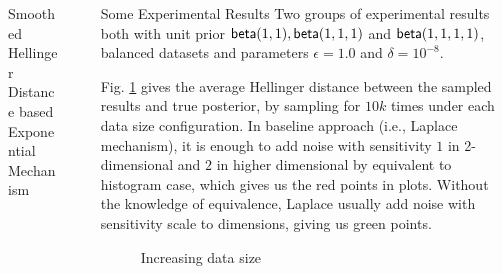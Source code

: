 \documentclass[final,hyperref={pdfpagelabels=false}]{beamer}
\begin{document}
\begin{frame}[t]
\begin{columns}[t]
\begin{column}{.485\textwidth}
\begin{block}{Smoothed Hellinger Distance based Exponential Mechanism}
\end{block}


\end{column} %

\begin{column}{.01\textwidth}\end{column} %
 
\begin{column}{.485\textwidth} %






\begin{block}{Some Experimental Results}
Two groups of experimental results both with unit prior $\mathsf{beta}(1,1), \mathsf{beta}(1,1,1)$ and $\mathsf{beta}(1,1,1,1)$, balanced datasets and parameters $\epsilon = 1.0$ and $\delta = 10^{-8}$.

Fig. \ref{fig_sampling} gives the average Hellinger distance between the sampled results and true posterior, by sampling for $10k$ times under each data size configuration. In baseline approach (i.e., Laplace mechanism), it is enough to add noise with sensitivity $1$ in 2-dimensional and $2$ in higher dimensional by equivalent to histogram case, which gives us the red points in plots. Without the knowledge of equivalence, Laplace usually add noise with sensitivity scale to dimensions, giving us green points. 

\begin{figure}[H]
\begin{center}
\centering
  \caption{Increasing data size}
\label{fig_sampling}
\end{center}
\end{figure}


\end{block}
\end{column}
\end{columns}
\end{frame}
\end{document}
